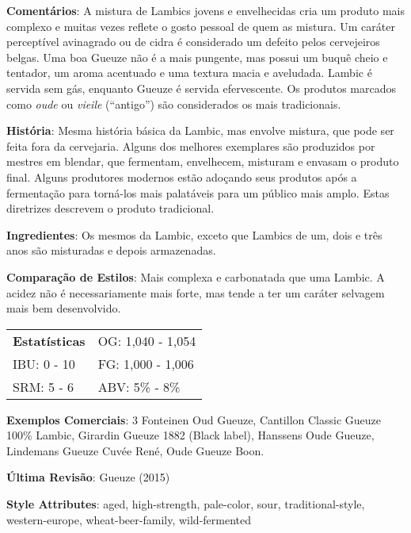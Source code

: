 \textbf{Comentários}: A mistura de Lambics jovens e envelhecidas cria um produto mais complexo e muitas vezes reflete o gosto pessoal de quem as mistura. Um caráter perceptível avinagrado ou de cidra é considerado um defeito pelos cervejeiros belgas. Uma boa Gueuze não é a mais pungente, mas possui um buquê cheio e tentador, um aroma acentuado e uma textura macia e aveludada. Lambic é servida sem gás, enquanto Gueuze é servida efervescente. Os produtos marcados como \textit{oude} ou \textit{vieile} (“antigo”) são considerados os mais tradicionais.

\textbf{História}: Mesma história básica da Lambic, mas envolve mistura, que pode ser feita fora da cervejaria. Alguns dos melhores exemplares são produzidos por mestres em blendar, que fermentam, envelhecem, misturam e envasam o produto final. Alguns produtores modernos estão adoçando seus produtos após a fermentação para torná-los mais palatáveis para um público mais amplo. Estas diretrizes descrevem o produto tradicional.

\textbf{Ingredientes}: Os mesmos da Lambic, exceto que Lambics de um, dois e três anos são misturadas e depois armazenadas.

\textbf{Comparação de Estilos}: Mais complexa e carbonatada que uma Lambic. A acidez não é necessariamente mais forte, mas tende a ter um caráter selvagem mais bem desenvolvido.

\begin{tabular}{@{}p{35mm}p{35mm}@{}}
  \textbf{Estatísticas} & OG: 1,040 - 1,054 \\
  IBU: 0 - 10  & FG: 1,000 - 1,006  \\
  SRM: 5 - 6  & ABV: 5\% - 8\%
\end{tabular}

\textbf{Exemplos Comerciais}: 3 Fonteinen Oud Gueuze, Cantillon Classic Gueuze 100\% Lambic, Girardin Gueuze 1882 (Black label), Hanssens Oude Gueuze, Lindemans Gueuze Cuvée René, Oude Gueuze Boon.

\textbf{Última Revisão}: Gueuze (2015)

\textbf{Style Attributes}: aged, high-strength, pale-color, sour, traditional-style, western-europe, wheat-beer-family, wild-fermented

